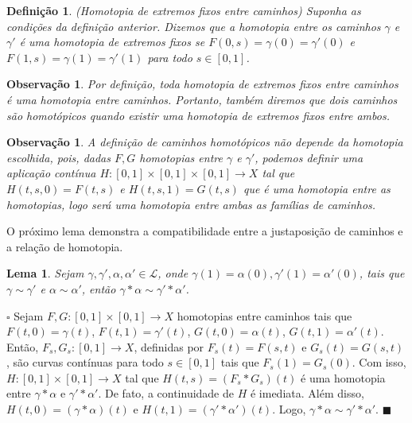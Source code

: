 \documentclass[12pt]{book}
\newtheorem{lema}[teorema]{Lema}
\newtheorem{definicao}[teorema]{Definição}
\newtheorem{observacao}[teorema]{Observação}
\newenvironment{prova}[1]{$\square$ #1}{\hfill$\blacksquare$}
\newcommand{\caminhos}{\mathcal{L}}
\newcommand{\intervalo}{[0,1]}
\begin{document}
	\begin{definicao}\label{definicao_homotopia_extremos_fixos}
		(Homotopia de extremos fixos entre caminhos) Suponha as condições da definição anterior. Dizemos que a homotopia entre os caminhos $\gamma$ e $\gamma'$ é uma homotopia de extremos fixos se $F(0,s) = \gamma(0) = \gamma'(0)$ e $F(1,s) = \gamma(1) = \gamma'(1)$ para todo $s\in \intervalo$.
	\end{definicao}
	
	\begin{observacao}
		Por definição, toda homotopia de extremos fixos entre caminhos é uma homotopia entre caminhos. Portanto, também diremos que dois caminhos são homotópicos quando existir uma homotopia de extremos fixos entre ambos.
	\end{observacao}
	
	\begin{observacao}
		A definição de caminhos homotópicos não depende da homotopia escolhida, pois, dadas $F,G$ homotopias entre $\gamma$ e $\gamma'$, podemos definir uma aplicação contínua $H: [0,1] \times [0,1] \times [0,1] \to X$ tal que $H(t,s ,0) = F(t,s)$ e $H(t,s, 1) = G(t,s)$ que é uma homotopia entre as homotopias, logo será uma homotopia entre ambas as famílias de caminhos.
	\end{observacao}
	
	O próximo lema demonstra a compatibilidade entre a justaposição de caminhos e a relação de homotopia.
	
	\begin{lema}\label{lema_compatibilidade_produto_caminhos}
		Sejam $\gamma, \gamma', \alpha, \alpha' \in \caminhos$, onde $\gamma(1) = \alpha(0), \gamma'(1) = \alpha'(0) $, tais que $\gamma \sim \gamma'$ e $\alpha \sim \alpha'$, então $\gamma * \alpha \sim \gamma' * \alpha'$.
	\end{lema}
	\begin{prova}
		Sejam  $F, G:[0,1] \times [0,1] \to X$ homotopias entre caminhos tais que $F(t,0)=\gamma(t)$, $F(t,1)=\gamma'(t)$, $G(t,0)=\alpha(t)$, $G(t,1)=\alpha'(t)$. Então, $F_{s}, G_{s}:\intervalo \to X$, definidas por $F_{s}(t) = F(s,t)$ e $G_{s}(t) = G(s,t)$, são curvas contínuas para todo $s \in \intervalo$ tais que $F_{s}(1) = G_{s}(0)$. Com isso, $H :\intervalo\times \intervalo\to X$ tal que $H(t, s)=(F_{s}*G_{s})(t)$ é uma homotopia entre $\gamma*\alpha$ e $\gamma'*\alpha'$. De fato, a continuidade de $H$ é imediata. Além disso, $H(t, 0) = (\gamma*\alpha)(t)$ e $H(t, 1) = (\gamma'*\alpha')(t)$. Logo, $\gamma*\alpha \sim \gamma'*\alpha'$.
	\end{prova}
	
\end{document}
